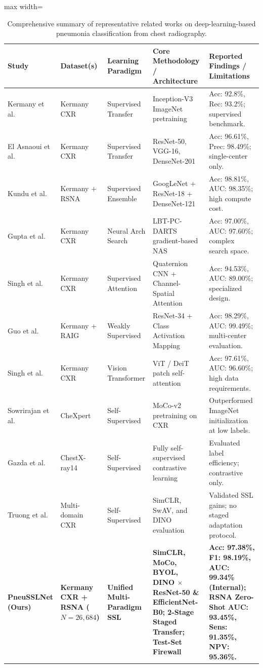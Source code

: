 \documentclass[journal,article,submit,moreauthors,pdftex]{Definitions/tsp}
\begin{document}
\begin{table}[t]
\tablesize{\scriptsize}
\centering
\caption{Comprehensive summary of representative related works on deep-learning-based pneumonia classification from chest radiography.}
\label{tab:related_works}
\begin{threeparttable}
\begin{adjustbox}{max width=\textwidth}
\begin{tabular}{p{2.8cm} p{2.2cm} p{2.4cm} p{4.6cm} p{5.2cm}}
\toprule
\textbf{Study} & \textbf{Dataset(s)} & \textbf{Learning Paradigm} & \textbf{Core Methodology / Architecture} & \textbf{Reported Findings / Limitations} \\
\midrule
Kermany et al. \cite{Kermany18} & Kermany CXR & Supervised Transfer & Inception-V3 ImageNet pretraining & Acc: 92.8\%, Rec: 93.2\%; supervised benchmark. \\
El Asnaoui et al. \cite{ElAsnaoui21} & Kermany CXR & Supervised Transfer & ResNet-50, VGG-16, DenseNet-201 & Acc: 96.61\%, Prec: 98.49\%; single-center only. \\
Kundu et al. \cite{Kundu21} & Kermany + RSNA & Supervised Ensemble & GoogLeNet + ResNet-18 + DenseNet-121 & Acc: 98.81\%, AUC: 98.35\%; high compute cost. \\
Gupta et al. \cite{Gupta22} & Kermany CXR & Neural Arch Search & LBT-PC-DARTS gradient-based NAS & Acc: 97.00\%, AUC: 97.60\%; complex search space. \\
Singh et al. \cite{Singh23} & Kermany CXR & Supervised Attention & Quaternion CNN + Channel-Spatial Attention & Acc: 94.53\%, AUC: 89.00\%; specialized design. \\
Guo et al. \cite{Guo23} & Kermany + RAIG & Weakly Supervised & ResNet-34 + Class Activation Mapping & Acc: 98.29\%, AUC: 99.49\%; multi-center evaluation. \\
Singh et al. \cite{Singh24} & Kermany CXR & Vision Transformer & ViT / DeiT patch self-attention & Acc: 97.61\%, AUC: 96.60\%; high data requirements. \\
Sowrirajan et al. \cite{Sowrirajan21} & CheXpert & Self-Supervised & MoCo-v2 pretraining on CXR & Outperformed ImageNet initialization at low labels. \\
Gazda et al. \cite{Gazda21} & ChestX-ray14 & Self-Supervised & Fully self-supervised contrastive learning & Evaluated label efficiency; contrastive only. \\
Truong et al. \cite{Truong21} & Multi-domain CXR & Self-Supervised & SimCLR, SwAV, and DINO evaluation & Validated SSL gains; no staged adaptation protocol. \\
\midrule
\textbf{PneuSSLNet (Ours)} & \textbf{Kermany CXR + RSNA ($N=26,684$)} & \textbf{Unified Multi-Paradigm SSL} & \textbf{SimCLR, MoCo, BYOL, DINO $\times$ ResNet-50 \& EfficientNet-B0; 2-Stage Staged Transfer; Test-Set Firewall} & \textbf{Acc: 97.38\%, F1: 98.19\%, AUC: 99.34\% (Internal); RSNA Zero-Shot AUC: 93.45\%, Sens: 91.35\%, NPV: 95.36\%.} \\
\bottomrule
\end{tabular}
\end{adjustbox}
\end{threeparttable}
\end{table}
\end{document}
